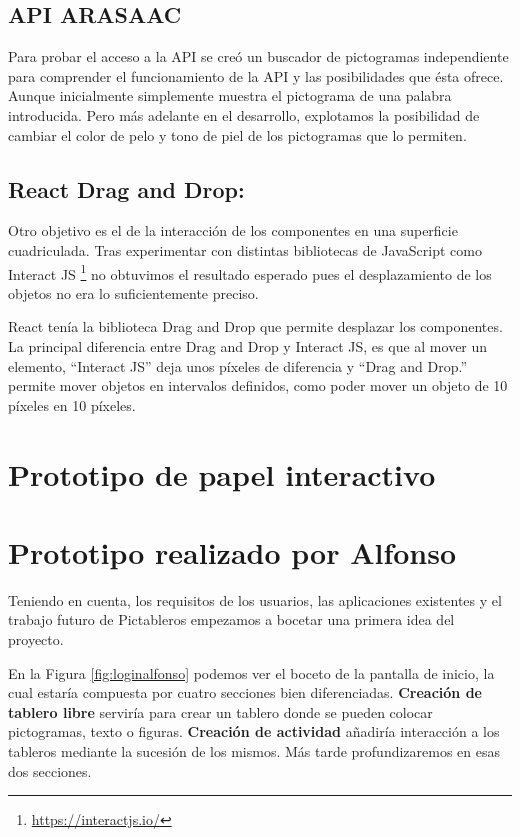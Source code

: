 \subsection{API ARASAAC}

Para probar el acceso a la API se creó un buscador de pictogramas independiente para comprender el funcionamiento de la API y las posibilidades que ésta ofrece. Aunque inicialmente simplemente muestra el pictograma de una palabra introducida. Pero más adelante en el desarrollo, explotamos la posibilidad de cambiar el color de pelo y tono de piel de los pictogramas que lo permiten.


\subsection{React Drag and Drop:}

Otro objetivo es el de la interacción de los componentes en una superficie cuadriculada. Tras experimentar con distintas bibliotecas de JavaScript como Interact JS \footnote{\url{https://interactjs.io/}} no obtuvimos el resultado esperado pues el desplazamiento de los objetos no era lo suficientemente preciso.

React tenía la biblioteca Drag and Drop que permite desplazar los componentes. La principal diferencia entre Drag and Drop y Interact JS, es que al mover un elemento, “Interact JS”  deja unos píxeles de diferencia y “Drag and Drop.” permite mover objetos en intervalos definidos, como poder mover un objeto de 10 píxeles en 10 píxeles.


\section{Prototipo de papel interactivo}

\section*{Prototipo realizado por Alfonso}

Teniendo en cuenta, los requisitos de los usuarios, las aplicaciones existentes y el trabajo futuro de Pictableros empezamos a bocetar una primera idea del proyecto.


En la Figura \ref{fig:loginalfonso} podemos ver el boceto de la pantalla de  inicio, la cual estaría compuesta por cuatro secciones bien diferenciadas.\textbf{ Creación de tablero libre} serviría para crear un tablero donde se pueden colocar pictogramas, texto o figuras. \textbf{Creación de actividad} añadiría interacción a los tableros mediante la sucesión de los mismos. Más tarde profundizaremos en esas dos secciones.


